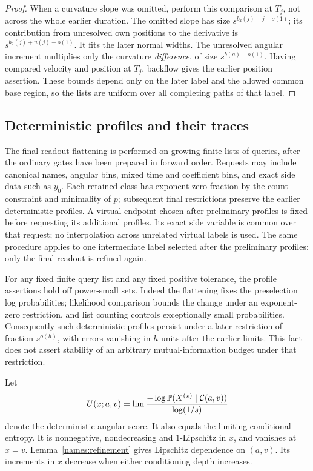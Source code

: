 \begin{proof}
When a curvature slope was omitted, perform this comparison at
\(T_j\), not across the whole earlier duration. The omitted slope
has size \(s^{b_2(j)-j-o(1)}\); its contribution from unresolved
own positions to the derivative is
\(s^{b_2(j)+u(j)-o(1)}\). It fits the later normal widths.
The unresolved angular increment multiplies only the curvature
\emph{difference}, of size \(s^{b(a)-o(1)}\). Having compared
velocity and position at \(T_j\), backflow gives the earlier
position assertion. These bounds depend only on the later label
and the allowed common base region, so the lists are uniform over
all completing paths of that label.
\end{proof}

\subsection{Deterministic profiles and their traces}

The final-readout flattening is performed on growing finite lists of
queries, after the ordinary gates have been prepared in forward
order. Requests may include canonical names, angular bins, mixed
time and coefficient bins, and exact side data such as \(y_0\).
Each retained class has exponent-zero fraction by the count
constraint and minimality of \(p\); subsequent final restrictions
preserve the earlier deterministic profiles. A virtual endpoint
chosen after preliminary profiles is fixed before requesting its
additional profiles. Its exact side variable is common over that
request; no interpolation across unrelated virtual labels is used.
The same procedure applies to one intermediate label selected after
the preliminary profiles: only the final readout is refined again.

For any fixed finite query list and any fixed positive tolerance,
the profile assertions hold off power-small sets. Indeed the
flattening fixes the preselection log probabilities; likelihood
comparison bounds the change under an exponent-zero restriction,
and list counting controls exceptionally small probabilities.
Consequently such deterministic profiles persist under a later
restriction of fraction \(s^{o(h)}\), with errors vanishing in
\(h\)-units after the earlier limits. This fact does not assert
stability of an arbitrary mutual-information budget under that
restriction.

Let
\[
 U(x;a,v)=\lim\frac{-\log\mathbb P(X^{(x)}\mid\mathcal C(a,v))}
                         {\log(1/s)}
\]
denote the deterministic angular score. It also equals the limiting
conditional entropy. It is nonnegative, nondecreasing and
\(1\)-Lipschitz in \(x\), and vanishes at \(x=v\).
Lemma~\ref{names:refinement} gives Lipschitz dependence on \((a,v)\).
Its increments in \(x\) decrease when either conditioning depth
increases.

